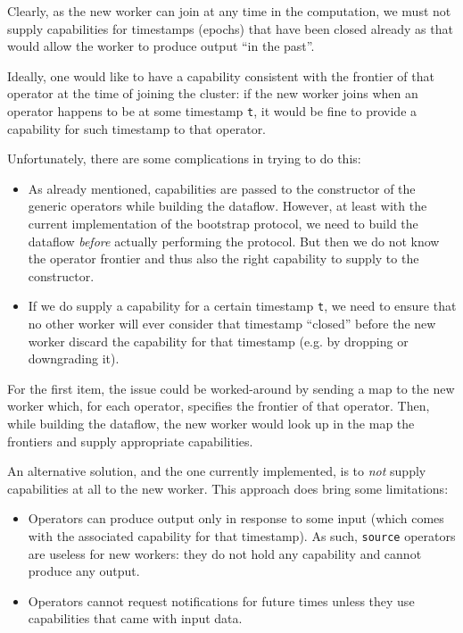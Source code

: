 \documentclass[12pt]{extarticle}
\begin{document}
Clearly, as the new worker can join at any time in the computation, we must not supply
capabilities for timestamps (epochs) that have been closed already as that would allow
the worker to produce output ``in the past''.

Ideally, one would like to have a capability consistent with the frontier
of that operator at the time of joining the cluster: if the new worker joins when
an operator happens to be at some timestamp \verb|t|, it would be fine to provide
a capability for such timestamp to that operator.


Unfortunately, there are some complications in trying to do this:
\begin{itemize}
    \item As already mentioned, capabilities are passed to the constructor
        of the generic operators while building the dataflow. However, at least
        with the current implementation of the bootstrap protocol, we need to build
        the dataflow \textit{before} actually performing the protocol. But then
        we do not know the operator frontier and thus also the right capability to supply to the constructor.

    \item If we do supply a capability for a certain timestamp \verb|t|, we need to ensure
        that no other worker will ever consider that timestamp ``closed'' before the new
        worker discard the capability for that timestamp (e.g. by dropping or downgrading it).

\end{itemize}

For the first item, the issue could be worked-around by sending a map to the new
worker which, for each operator, specifies the frontier of that operator.
Then, while building the dataflow, the new worker would look up in the map the frontiers
and supply appropriate capabilities.

An alternative solution, and the one currently implemented, is to \textit{not} supply capabilities at all to the new worker.
This approach does bring some limitations:
\begin{itemize}
    \item Operators can produce output only in response to some input (which comes with the associated capability for that timestamp).
        As such, \verb|source| operators are useless for new workers: they do not hold any capability and cannot produce any output.
    \item Operators cannot request notifications for future times unless they use capabilities that came with input data.
\end{itemize}
\end{document}
